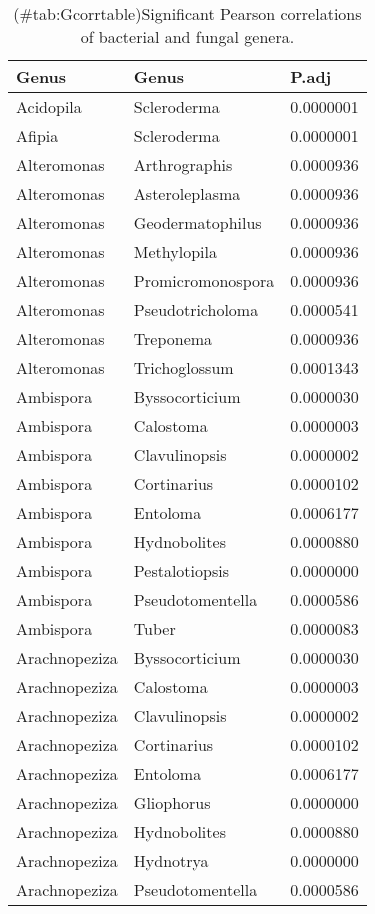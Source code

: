 \documentclass[border=1mm]{standalone}
\begin{document}
\begin{longtable}[t]{lll}
\caption{(\#tab:Gcorrtable)Significant Pearson correlations of bacterial and fungal genera.}\\
\toprule
Genus & Genus & P.adj\\
\midrule
Acidopila & Scleroderma & 0.0000001\\
Afipia & Scleroderma & 0.0000001\\
Alteromonas & Arthrographis & 0.0000936\\
Alteromonas & Asteroleplasma & 0.0000936\\
Alteromonas & Geodermatophilus & 0.0000936\\
\addlinespace
Alteromonas & Methylopila & 0.0000936\\
Alteromonas & Promicromonospora & 0.0000936\\
Alteromonas & Pseudotricholoma & 0.0000541\\
Alteromonas & Treponema & 0.0000936\\
Alteromonas & Trichoglossum & 0.0001343\\
\addlinespace
Ambispora & Byssocorticium & 0.0000030\\
Ambispora & Calostoma & 0.0000003\\
Ambispora & Clavulinopsis & 0.0000002\\
Ambispora & Cortinarius & 0.0000102\\
Ambispora & Entoloma & 0.0006177\\
\addlinespace
Ambispora & Hydnobolites & 0.0000880\\
Ambispora & Pestalotiopsis & 0.0000000\\
Ambispora & Pseudotomentella & 0.0000586\\
Ambispora & Tuber & 0.0000083\\
Arachnopeziza & Byssocorticium & 0.0000030\\
\addlinespace
Arachnopeziza & Calostoma & 0.0000003\\
Arachnopeziza & Clavulinopsis & 0.0000002\\
Arachnopeziza & Cortinarius & 0.0000102\\
Arachnopeziza & Entoloma & 0.0006177\\
Arachnopeziza & Gliophorus & 0.0000000\\
\addlinespace
Arachnopeziza & Hydnobolites & 0.0000880\\
Arachnopeziza & Hydnotrya & 0.0000000\\
Arachnopeziza & Pseudotomentella & 0.0000586\\

\end{longtable}
\end{document}

